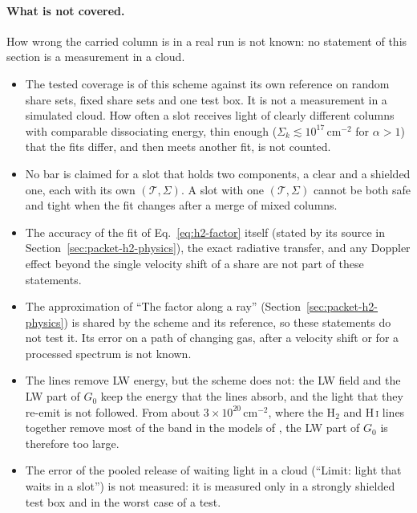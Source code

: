 \paragraph{What is not covered.} How wrong the carried column is in a real
run is not known: no statement of this section is a measurement in a cloud.
\begin{itemize}
  \item The tested coverage is of this scheme against its own reference on
    random share sets, fixed share sets and one test box. It is not a measurement in a simulated cloud. How often a
    slot receives light of clearly different columns with comparable
    dissociating energy, thin enough ($\Sigma_k\lesssim10^{17}$\,cm$^{-2}$ for
    $\alpha>1$) that the fits differ, and then meets another fit, is not
    counted.
  \item No bar is claimed for a slot that holds two components, a clear and a
    shielded one, each with its own $(\mathcal T,\Sigma)$. A slot with one
    $(\mathcal T,\Sigma)$ cannot be both safe and tight when the fit changes
    after a merge of mixed columns.
  \item The accuracy of the fit of Eq.~\eqref{eq:h2-factor} itself (stated by
    its source in Section~\ref{sec:packet-h2-physics}), the exact radiative
    transfer, and any Doppler effect beyond the single velocity shift of a
    share are not part of these statements.
  \item The approximation of ``The factor along a ray''
    (Section~\ref{sec:packet-h2-physics}) is shared by the scheme and its
    reference, so these statements do not test it. Its error on a path of
    changing gas, after a velocity shift or for a processed spectrum is not
    known.
  \item The lines remove LW energy, but the scheme does not: the LW field and
    the LW part of $G_0$ keep the energy that the lines absorb, and the light
    that they re-emit is not followed. From about
    $3\times10^{20}$\,cm$^{-2}$, where the H$_2$ and H\,\textsc{i} lines
    together remove most of the band in the models of
    \citet{DraineBertoldi1996}, the LW part of $G_0$ is therefore too large.
  \item The error of the pooled release of waiting light in a cloud
    (``Limit: light that waits in a slot'') is not measured: it is measured
    only in a strongly shielded test box and in the worst case of a test.
\end{itemize}

